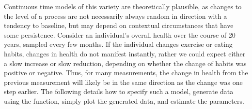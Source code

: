 \documentclass[nojss]{jss}\usepackage[]{graphicx}\usepackage[]{color}
\begin{document}
Continuous time models of this variety are theoretically plausible, as changes to the level of a process are not necessarily always random in direction with a tendency to baseline, but may depend on contextual circumstances that have some persistence.  Consider an individual's overall health over the course of 20 years, sampled every few months.  If the individual changes exercise or eating habits, changes in health do not manifest instantly, rather we could expect either a slow increase or slow reduction, depending on whether the change of habits was positive or negative. Thus, for many measurements, the change in health from the previous measurement will likely be in the same direction as the change was one step earlier. The following details how to specify such a model, generate data using the  function, simply plot the generated data, and estimate the parameters.
\end{document}
